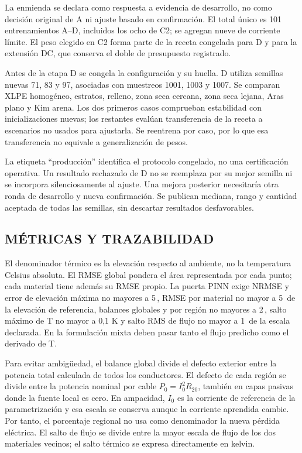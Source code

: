 La enmienda se declara como respuesta a evidencia de desarrollo, no como decisión original de A ni ajuste basado en confirmación. El total único es 101 entrenamientos A--D, incluidos los ocho de C2; se agregan nueve de corriente límite. El peso elegido en C2 forma parte de la receta congelada para D y para la extensión DC, que conserva el doble de presupuesto registrado.

Antes de la etapa D se congela la configuración y su huella. D utiliza semillas nuevas 71, 83 y 97, asociadas con muestreos 1001, 1003 y 1007. Se comparan XLPE homogéneo, estratos, relleno, zona seca cercana, zona seca lejana, Aras plano y Kim arena. Los dos primeros casos comprueban estabilidad con inicializaciones nuevas; los restantes evalúan transferencia de la receta a escenarios no usados para ajustarla. Se reentrena por caso, por lo que esa transferencia no equivale a generalización de pesos.

La etiqueta ``producción'' identifica el protocolo congelado, no una certificación operativa. Un resultado rechazado de D no se reemplaza por su mejor semilla ni se incorpora silenciosamente al ajuste. Una mejora posterior necesitaría otra ronda de desarrollo y nueva confirmación. Se publican mediana, rango y cantidad aceptada de todas las semillas, sin descartar resultados desfavorables.

\subsection{MÉTRICAS Y TRAZABILIDAD}

El denominador térmico es la elevación respecto al ambiente, no la temperatura Celsius absoluta. El RMSE global pondera el área representada por cada punto; cada material tiene además su RMSE propio. La puerta PINN exige NRMSE y error de elevación máxima no mayores a 5\,\pct{}, RMSE por material no mayor a 5\,\pct{} de la elevación de referencia, balances globales y por región no mayores a 2\,\pct{}, salto máximo de T no mayor a 0,1 K y salto RMS de flujo no mayor a 1\,\pct{} de la escala declarada. En la formulación mixta deben pasar tanto el flujo predicho como el derivado de T.

Para evitar ambigüedad, el balance global divide el defecto exterior entre la potencia total calculada de todos los conductores. El defecto de cada región se divide entre la potencia nominal por cable $P_0=I_0^2R_{20}$, también en capas pasivas donde la fuente local es cero. En ampacidad, $I_0$ es la corriente de referencia de la parametrización y esa escala se conserva aunque la corriente aprendida cambie. Por tanto, el porcentaje regional no usa como denominador la nueva pérdida eléctrica. El salto de flujo se divide entre la mayor escala de flujo de los dos materiales vecinos; el salto térmico se expresa directamente en kelvin.


